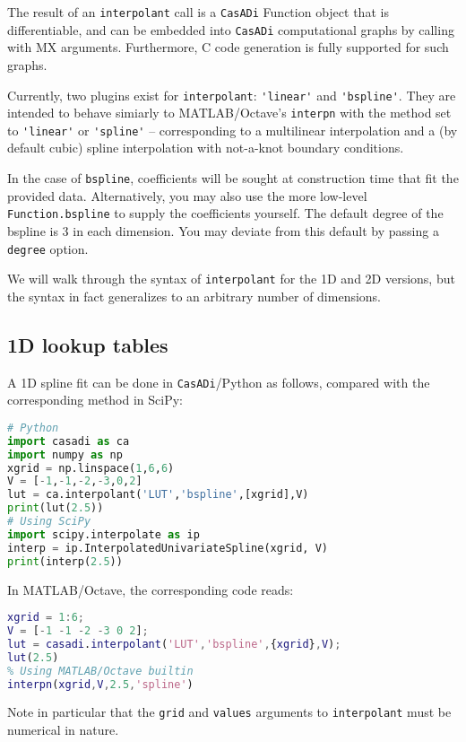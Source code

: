 \documentclass[a4paper,12pt]{book}
\newcommand{\CasADi}{\texttt{CasADi}\xspace}
\newcommand{\python}[1]{\lstinline[language=Python]{#1}}
\begin{document}
The result of an \python{interpolant} call is a \CasADi Function object that is differentiable, and can be embedded into \CasADi computational graphs by calling with MX arguments. Furthermore, C code generation is fully supported for such graphs.

Currently, two plugins exist for \python{interpolant}: \verb|'linear'| and \verb|'bspline'|. They are intended to behave simiarly to MATLAB/Octave's \texttt{interpn} with the method set to \verb|'linear'| or \verb|'spline'| -- corresponding to a multilinear interpolation and a (by default cubic) spline interpolation with
not-a-knot boundary conditions.

In the case of \verb|bspline|, coefficients will be sought at construction time that fit the provided data. Alternatively, you may also use the more low-level \verb|Function.bspline| to supply the coefficients yourself. The default degree of the bspline is 3 in each dimension. You may deviate from this default by passing a \verb|degree| option.

We will walk through the syntax of \verb|interpolant| for the 1D and 2D versions, but the syntax in fact generalizes to an arbitrary number of dimensions.

\subsection{1D lookup tables}
A 1D spline fit can be done in \CasADi/Python as follows, compared with the corresponding method in SciPy:

\begin{lstlisting}[language=Python]
# Python
import casadi as ca
import numpy as np
xgrid = np.linspace(1,6,6)
V = [-1,-1,-2,-3,0,2]
lut = ca.interpolant('LUT','bspline',[xgrid],V)
print(lut(2.5))
# Using SciPy
import scipy.interpolate as ip
interp = ip.InterpolatedUnivariateSpline(xgrid, V)
print(interp(2.5))
\end{lstlisting}

In MATLAB/Octave, the corresponding code reads:

\begin{lstlisting}[language=Matlab]
% MATLAB/Octave
xgrid = 1:6;
V = [-1 -1 -2 -3 0 2];
lut = casadi.interpolant('LUT','bspline',{xgrid},V);
lut(2.5)
% Using MATLAB/Octave builtin
interpn(xgrid,V,2.5,'spline')
\end{lstlisting}

Note in particular that the \python{grid} and \python{values} arguments to \texttt{interpolant} must be numerical in nature.
\end{document}
